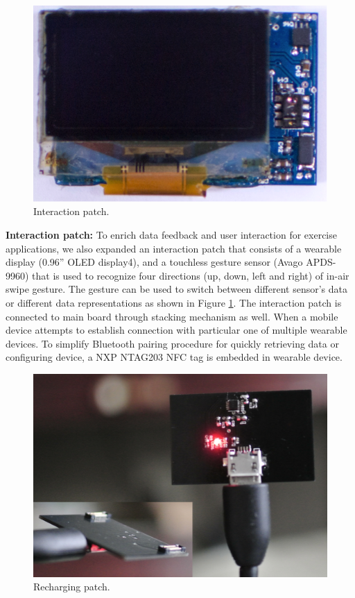 \begin{figure}[ht]
\centering
\includegraphics[width=12.5cm]{image/bio_fig1_5}
\caption{Interaction patch.}
\label{interaction_patch}
\end{figure}
\newline
\textbf{Interaction patch:}
\newline
To enrich data feedback and user interaction for exercise applications, we also expanded an interaction patch that consists of a wearable display (0.96” OLED display4), and a touchless gesture sensor (Avago APDS-9960) that is used to recognize four directions (up, down, left and right) of in-air swipe gesture. The gesture can be used to switch between different sensor's data or different data representations as shown in Figure \ref{interaction_patch}. The interaction patch is connected to main board through stacking mechanism as well. When a mobile device attempts to establish connection with particular one of multiple wearable devices. To simplify Bluetooth pairing procedure for quickly retrieving data or configuring device, a NXP NTAG203 NFC tag is embedded in wearable device.
\vspace{10pt}
\begin{figure}[ht]
\centering
\includegraphics[width=13cm]{image/bio_recharge}
\caption{Recharging patch.}
\label{bio_recharge}
\end{figure}
